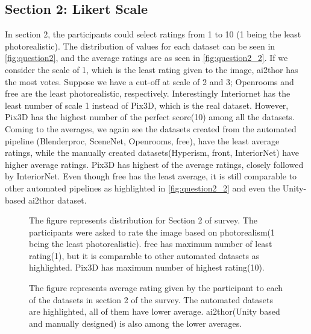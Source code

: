 \subsection{Section 2: Likert Scale}
In section 2, the participants could select ratings from 1 to 10 (1 being the least photorealistic).
The distribution of values for each dataset can be seen in \autoref{fig:question2}, and the average ratings are as seen in \autoref{fig:question2_2}.
If we consider the scale of 1, which is the least rating given to the image, \gls{ai2thor} has the most votes.
Suppose we have a cut-off at scale of 2 and 3; Openrooms and \gls{free} are the least photorealistic, respectively.
Interestingly Interiornet has the least number of scale 1 instead of Pix3D, which is the real dataset.
However, Pix3D has the highest number of the perfect score(10) among all the datasets.
Coming to the averages, we again see the datasets created from the automated pipeline (Blenderproc, SceneNet, Openrooms, \gls{free}), have the least average ratings,
while the manually created datasets(Hyperism, \gls{front}, InteriorNet) have higher average ratings.
Pix3D has highest of the average ratings, closely followed by InteriorNet.
Even though \gls{free} has the least average, it is still comparable to other automated pipelines as highlighted in \autoref{fig:question2_2} and even the Unity-based \gls{ai2thor} dataset.

\begin{figure}
    \centering
    \resizebox{\textwidth}{!}{}
    \caption[Distibution for Survey:Section 2]{The figure represents distribution for Section 2 of survey. The participants were asked to rate the image based on photorealism(1 being the least photorealistic).
    \gls{free} has maximum number of least rating(1), but it is comparable to other automated datasets as highlighted. Pix3D has maximum number of highest rating(10).}
    \label{fig:question2}
\end{figure}

\begin{figure}
    \centering
    \resizebox{0.75\textwidth}{10cm}{}
    \caption[Average Ratings for Survey:Section 2]{The figure represents average rating given by the participant to each of the datasets in section 2 of the survey.
    The automated datasets are highlighted, all of them have lower average. \gls{ai2thor}(Unity based and manually designed) is also among the lower averages.}
    \label{fig:question2_2}
\end{figure}

